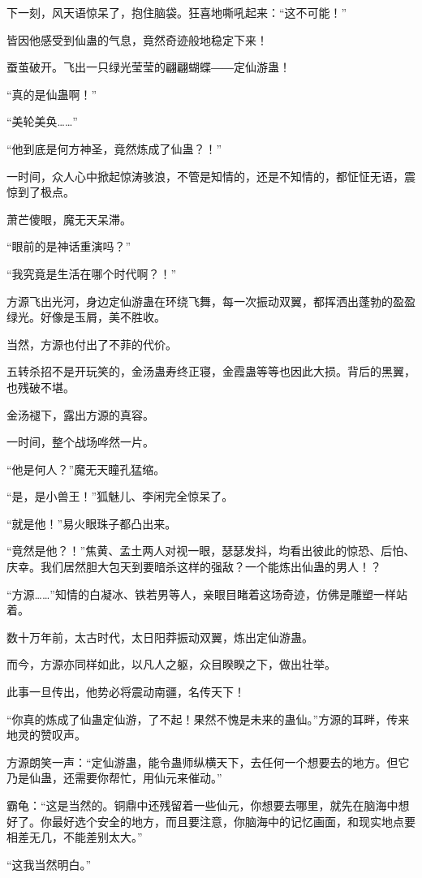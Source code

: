 \begin{this_body}
下一刻，风天语惊呆了，抱住脑袋。狂喜地嘶吼起来：“这不可能！”

皆因他感受到仙蛊的气息，竟然奇迹般地稳定下来！

蚕茧破开。飞出一只绿光莹莹的翩翩蝴蝶――定仙游蛊！

“真的是仙蛊啊！”

“美轮美奂……”

“他到底是何方神圣，竟然炼成了仙蛊？！”

一时间，众人心中掀起惊涛骇浪，不管是知情的，还是不知情的，都怔怔无语，震惊到了极点。

萧芒傻眼，魔无天呆滞。

“眼前的是神话重演吗？”

“我究竟是生活在哪个时代啊？！”

方源飞出光河，身边定仙游蛊在环绕飞舞，每一次振动双翼，都挥洒出蓬勃的盈盈绿光。好像是玉屑，美不胜收。

当然，方源也付出了不菲的代价。

五转杀招不是开玩笑的，金汤蛊寿终正寝，金霞蛊等等也因此大损。背后的黑翼，也残破不堪。

金汤褪下，露出方源的真容。

一时间，整个战场哗然一片。

“他是何人？”魔无天瞳孔猛缩。

“是，是小兽王！”狐魅儿、李闲完全惊呆了。

“就是他！”易火眼珠子都凸出来。

“竟然是他？！”焦黄、孟土两人对视一眼，瑟瑟发抖，均看出彼此的惊恐、后怕、庆幸。我们居然胆大包天到要暗杀这样的强敌？一个能炼出仙蛊的男人！？

“方源……”知情的白凝冰、铁若男等人，亲眼目睹着这场奇迹，仿佛是雕塑一样站着。

数十万年前，太古时代，太日阳莽振动双翼，炼出定仙游蛊。

而今，方源亦同样如此，以凡人之躯，众目睽睽之下，做出壮举。

此事一旦传出，他势必将震动南疆，名传天下！

“你真的炼成了仙蛊定仙游，了不起！果然不愧是未来的蛊仙。”方源的耳畔，传来地灵的赞叹声。

方源朗笑一声：“定仙游蛊，能令蛊师纵横天下，去任何一个想要去的地方。但它乃是仙蛊，还需要你帮忙，用仙元来催动。”

霸龟：“这是当然的。铜鼎中还残留着一些仙元，你想要去哪里，就先在脑海中想好了。你最好选个安全的地方，而且要注意，你脑海中的记忆画面，和现实地点要相差无几，不能差别太大。”

“这我当然明白。”


\end{this_body}
